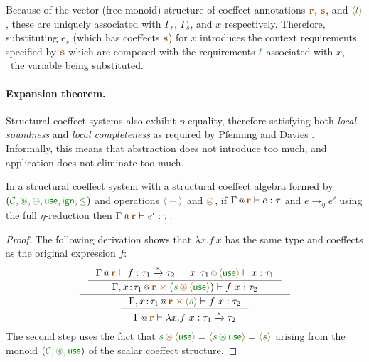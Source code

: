 \noindent
Because of the vector (free monoid) structure of coeffect annotations $\aclrd{\textbf{r}}$, 
$\aclrd{\textbf{s}}$, and $\alift{\cclrd{t}}$, these are uniquely associated with $\Gamma_r$, 
$\Gamma_s$, and $x$ respectively. Therefore, substituting $e_s$ (which has coeffects 
$\aclrd{\textbf{s}}$) for $x$ introduces the context requirements specified by $\aclrd{\textbf{s}}$
which are composed with the requirements $\cclrd{t}$ associated with $x$, \ie~the variable being 
substituted. 

\paragraph{Expansion theorem.}
Structural coeffect systems also exhibit $\eta$-equality, therefore satisfying both
\emph{local soundness} and \emph{local completeness} as required by Pfenning and Davies
\cite{logic-modal-reconstruction}. Informally, this means that abstraction does not introduce 
too much, and application does not eliminate too much.

\begin{theorem}
In a structural coeffect system with a structural coeffect algebra formed by 
$(\C, \cseq, \cpar, \cunit, \czero, \cleq)$ and operations $\alift{-}$ and $\aseq$,
if $\coctx{\Gamma}{\aclrd{\textbf{r}}} \vdash e : \tau$ 
and $e \rightarrow_{\eta} e'$ using the full $\eta$-reduction then
$\coctx{\Gamma}{\aclrd{\textbf{r}}} \vdash e' : \tau$.
\end{theorem}
\begin{proof}
The following derivation shows that $\lambda x.f~x$ has the same type and coeffects as 
the original expression $f$:
\begin{equation*}
\inference
  { \inference
    { \coctx{\Gamma}{\aclrd{\textbf{r}}} \vdash f : \tau_1 \xrightarrow{\cclrd{s}} \tau_2 &
      \coctx{x\!:\!\tau_1}{\alift{\cunit}} \vdash x:\tau_1 }
    { \coctx{\Gamma, x\!:\!\tau_1}{\aclrd{\textbf{r}} \;\atimes\;(\cclrd{s}\,\aseq\,\alift{\cunit}) } \vdash f~x : \tau_2 } }
  { \inference
    { \coctx{\Gamma, x\!:\!\tau_1}{\aclrd{\textbf{r}} \;\atimes\,\alift{\cclrd{s}} } \vdash f~x : \tau_2 }
    { \coctx{\Gamma}{ \aclrd{\textbf{r}} } \vdash \lambda x.f~x : \tau_1 \xrightarrow{\cclrd{s}} \tau_2 } }
\end{equation*}
%
The second step uses the fact that 
$\cclrd{s} \,\aseq\, \alift{\cunit} = \alift{\cclrd{s} \,\cseq\, \cunit} = \alift{\cclrd{s}}$ 
arising from the monoid $(\C, \cseq, \cunit)$ of the scalar coeffect structure.
\end{proof}

